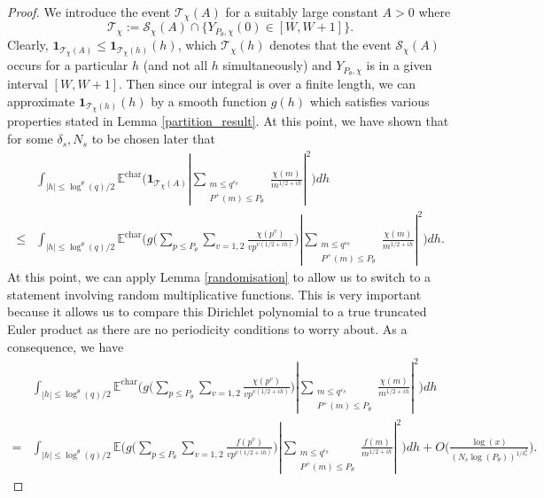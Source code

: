 \documentclass[reqno]{amsart}
\theoremstyle{definition}
\theoremstyle{remark}
\numberwithin{equation}{section}
\theoremstyle{remark}
\begin{document}
    \begin{proof}
    We introduce the event $\mathcal{T}_\chi(A)$ for a suitably large constant $A>0$ where
    $$\mathcal{T}_\chi := \mathcal{S}_{\chi}(A) \cap \{Y_{P_\theta,\chi}(0) \in [W,W+1]\}.$$
    Clearly, $\mathbf{1}_{\mathcal{T}_\chi(A)} \leq \mathbf{1}_{\mathcal{T}_\chi(h)}(h)$, which $\mathcal{T}_\chi(h)$ denotes that the event $\mathcal{S}_\chi(A)$ occurs for a particular $h$ (and not all $h$ simultaneously) and $Y_{P_\theta,\chi}$ is in a given interval $[W,W+1]$. Then since our integral is over a finite length, we can approximate $\mathbf{1}_{\mathcal{T}_\chi(h)}(h)$ by a smooth function $g(h)$ which satisfies various properties stated in Lemma \ref{partition_result}. At this point, we have shown that for some $\delta_s,N_s$ to be chosen later that
    \begin{align*}
        &\int_{|h| \leq \log^{\theta}(q)/2}\mathbb{E}^{\text{char}}\big(\mathbf{1}_{\mathcal{T}_\chi(A)}|\sum_{\substack{m \leq q^{\varepsilon_\theta} \\ P^+(m) \leq P_\theta}}\frac{\chi(m)}{m^{1/2+ih}}|^2\big)dh \\ \leq& \int_{|h| \leq \log^{\theta}(q)/2}\mathbb{E}^{\text{char}}\big(g\big(\sum_{p \leq P_\theta}\sum_{v=1,2}\frac{\chi(p^v)}{vp^{v(1/2+ih)}}\big)|\sum_{\substack{m \leq q^{\varepsilon_\theta} \\ P^+(m) \leq P_\theta}}\frac{\chi(m)}{m^{1/2+ih}}|^2\big)dh.
    \end{align*}
    At this point, we can apply Lemma \ref{randomisation} to allow us to switch to a statement involving random multiplicative functions. This is very important because it allows us to compare this Dirichlet polynomial to a true truncated Euler product as there are no periodicity conditions to worry about. As a consequence, we have
    \begin{align*}
        &\int_{|h| \leq \log^{\theta}(q)/2}\mathbb{E}^{\text{char}}\big(g\big(\sum_{p \leq P_\theta}\sum_{v=1,2}\frac{\chi(p^v)}{vp^{v(1/2+ih)}}\big)|\sum_{\substack{m \leq q^{\varepsilon_\theta} \\ P^+(m) \leq P_\theta}}\frac{\chi(m)}{m^{1/2+ih}}|^2\big)dh \\=&\int_{|h| \leq \log^{\theta}(q)/2}\mathbb{E}\big(g\big(\sum_{p \leq P_\theta}\sum_{v=1,2}\frac{f(p^v)}{vp^{v(1/2+ih)}}\big)|\sum_{\substack{m \leq q^{\varepsilon_\theta} \\ P^+(m) \leq P_\theta}}\frac{f(m)}{m^{1/2+ih}}|^2\big)dh + O\big(\frac{\log(x)}{(N_s\log(P_\theta))^{1/\delta_s^2}}\big).
    \end{align*}

\end{proof}
\end{document}

